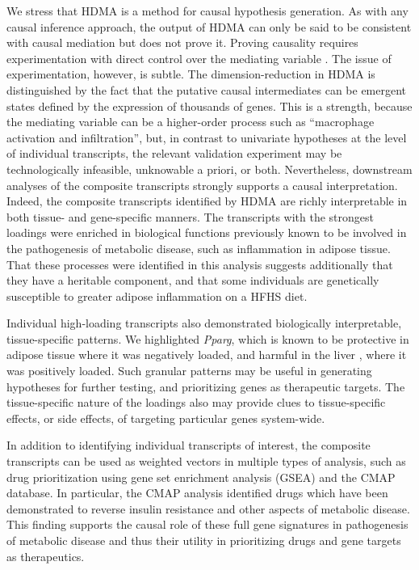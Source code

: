 We stress that HDMA is a method for causal hypothesis generation. As 
with any causal inference approach, the output of HDMA can only be 
said to be consistent with causal mediation but does not prove it. 
Proving causality requires experimentation with direct control over 
the mediating variable \cite{pearl2009causality}. The issue of 
experimentation, however, is subtle. The dimension-reduction in HDMA 
is distinguished by the fact that the putative causal intermediates 
can be emergent states defined by the expression of thousands of genes. 
This is a strength, because the mediating variable can be a higher-order 
process such as “macrophage activation and infiltration”, but, in contrast 
to univariate hypotheses at the level of individual transcripts, the 
relevant validation experiment may be technologically infeasible, 
unknowable a priori, or both. Nevertheless, downstream analyses 
of the composite transcripts strongly supports a causal interpretation. 
Indeed, the composite transcripts identified by HDMA are richly 
interpretable in both tissue- and gene-specific manners. The transcripts 
with the strongest loadings were enriched in biological functions 
previously known to be involved in the pathogenesis of metabolic disease, 
such as inflammation in adipose tissue. That these processes were 
identified in this analysis suggests additionally that they have a 
heritable component, and that some individuals are genetically susceptible 
to greater adipose inflammation on a HFHS diet.

Individual high-loading transcripts also demonstrated biologically 
interpretable, tissue-specific patterns. We highlighted
\textit{Pparg}, which is known to be protective in adipose 
tissue \cite{pmid17389767} where it was negatively loaded, 
and harmful in the liver \cite{pmid12805374, pmid12618528, 
pmid16357043, pmid15644454, pmid16403437}, where it was 
positively loaded. Such granular patterns may be useful
in generating hypotheses for further testing, and 
prioritizing genes as therapeutic targets. The 
tissue-specific nature of the loadings also may provide
clues to tissue-specific effects, or side effects, 
of targeting particular genes system-wide.

In addition to identifying individual transcripts of 
interest, the composite transcripts can be used as 
weighted vectors in multiple types of analysis, 
such as drug prioritization using gene set enrichment 
analysis (GSEA) and the CMAP database. In particular,
the CMAP analysis identified drugs which have been 
demonstrated to reverse insulin resistance and other 
aspects of metabolic disease. This finding supports the 
causal role of these full gene signatures in pathogenesis 
of metabolic disease and thus their utility in prioritizing 
drugs and gene targets as therapeutics.

